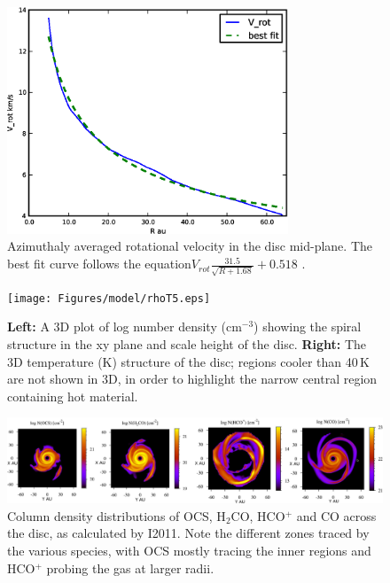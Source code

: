 \documentclass[useAMS,usenatbib]{mn2e}
\begin{document}
\begin{figure}
 \includegraphics[width=84mm]{Figures/model/rotational_velocities.eps}
 \caption{Azimuthaly averaged rotational velocity in the disc mid-plane. The best fit curve follows the equation$V_{rot}\frac{31.5}{\sqrt{R+1.68}}+0.518$ .}
 \label{velocity}
\end{figure}

\begin{figure}
 \texttt{[image: Figures/model/rhoT5.eps]}
 \caption{{\bf Left:} A 3D plot of log number density (cm$^{-3}$) showing the spiral structure in the xy plane and scale height of the disc. {\bf Right:} The 3D temperature (K) structure of the disc; regions cooler than 40$\,$K are not shown in 3D, in order to highlight the narrow central region containing hot material.}
 \label{rhoT} 
\end{figure}

\begin{figure}
 \includegraphics[width=168mm]{Figures/model/columnDensities3.eps}
 \caption{Column density distributions of OCS, H$_2$CO, HCO$^+$ and CO across the disc, as calculated by I2011. Note the different zones traced by the various species, with OCS mostly tracing the inner regions and HCO$^+$ probing the gas at larger radii.}
 \label{Chemistry} 
\end{figure}
\end{document}
